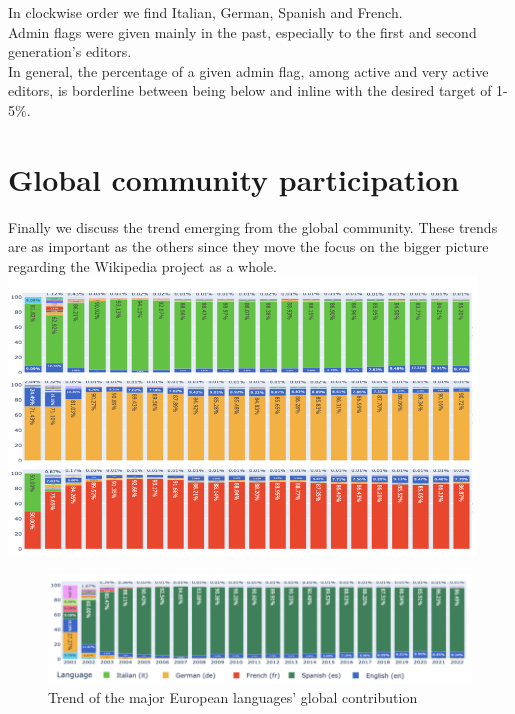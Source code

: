 In clockwise order we find Italian, German, Spanish and French.\\
Admin flags were given mainly in the past, especially to the first and second generation's editors.\\
In general, the percentage of a given admin flag, among active and very active editors, is borderline between being below and inline with the desired target of 1-5\%.

\section{Global community participation}
\label{sec:global_conclusion}

Finally we discuss the trend emerging from the global community. These trends are as important as the others since they move the focus on the bigger picture regarding the Wikipedia project as a whole. \\

\includegraphics[width=470px]{img/global_trend.png}
\pagebreak
\begin{figure}[h]
    \centering
    \includegraphics[width=470px]{img/global_trend1.png}
    \caption{Trend of the major European languages' global contribution}
    \label{fig:global_trend}
\end{figure}

